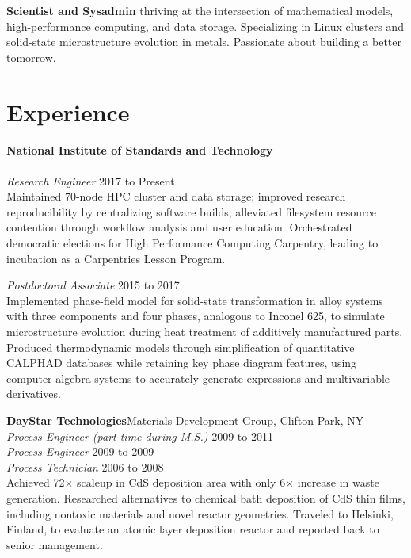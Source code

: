 \documentclass[margin]{res}
\begin{document}
\begin{resume}\textbf{Scientist and Sysadmin} thriving at the intersection of mathematical
models, high-performance computing, and data storage. Specializing in Linux
clusters and solid-state microstructure evolution in metals. Passionate about
building a better tomorrow.
\section{Experience}
\textbf{National Institute of Standards and Technology}\\[0.25\baselineskip]
\\
\textit{Research Engineer} \hfill{} 2017 to Present\\
Maintained 70-node HPC cluster and data storage; improved research reproducibility by centralizing software builds; alleviated filesystem resource contention through workflow analysis and user education. Orchestrated democratic elections for High Performance Computing Carpentry, leading to incubation as a Carpentries Lesson Program.


\textit{Postdoctoral Associate} \hfill{} 2015 to 2017\\
Implemented phase-field model for solid-state transformation in alloy systems with three components and four phases, analogous to Inconel 625, to simulate microstructure evolution during heat treatment of additively manufactured parts. Produced thermodynamic models through simplification of quantitative CALPHAD databases while retaining key phase diagram features, using computer algebra systems to accurately generate expressions and multivariable derivatives.


\textbf{DayStar Technologies}\hfill{}Materials Development Group, Clifton Park, NY\\
\textit{Process Engineer (part-time during M.S.)} \hfill{} 2009 to 2011\\
\textit{Process Engineer} \hfill{} 2009 to 2009\\
\textit{Process Technician} \hfill{} 2006 to 2008\\
Achieved 72$\times$ scaleup in CdS deposition area with only 6$\times$ increase in waste generation. Researched alternatives to chemical bath deposition of CdS thin films, including nontoxic materials and novel reactor geometries. Traveled to Helsinki, Finland, to evaluate an atomic layer deposition reactor and reported back to senior management.



\end{resume}
\end{document}
